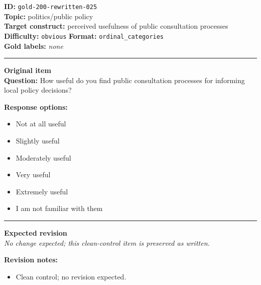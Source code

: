 \documentclass[10pt,a4paper]{article}
\newcommand{\sectionline}{\vspace{0.15em}\hrule\vspace{0.35em}}
\begin{document}
\begin{tcolorbox}[colframe=CleanGreen,colback=white,colbacktitle=CleanGreen!9,coltitle=black,title={Item 025\hfill Clean control}]
\textbf{ID:} \texttt{gold-200-rewritten-025}\\
\textbf{Topic:} politics/public policy\\
\textbf{Target construct:} perceived usefulness of public consultation processes\\
\textbf{Difficulty:} \texttt{obvious} \quad \textbf{Format:} \texttt{ordinal\_categories}\\
\textbf{Gold labels:} \textit{none}\\
\sectionline
\textbf{Original item}\\
\textbf{Question:} How useful do you find public consultation processes for informing local policy decisions?
\par\textbf{Response options:}
\begin{itemize}
\item Not at all useful
\item Slightly useful
\item Moderately useful
\item Very useful
\item Extremely useful
\item I am not familiar with them
\end{itemize}
\sectionline
\textbf{Expected revision}\\
\textit{No change expected; this clean-control item is preserved as written.}
\par\textbf{Revision notes:}
\begin{itemize}
\item Clean control; no revision expected.
\end{itemize}
\end{tcolorbox}
\end{document}
